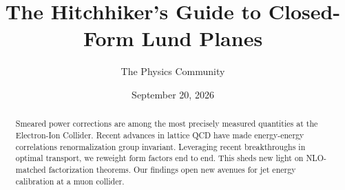 \documentclass[11pt]{article}
\title{The Hitchhiker's Guide to Closed-Form Lund Planes}
\author{The Physics Community}
\date{September 20, 2026}
\numberwithin{equation}{section}
\theoremstyle{definition}
\theoremstyle{remark}
\begin{document}
\maketitle
\begin{abstract}
Smeared power corrections are among the most precisely measured
quantities at the Electron-Ion Collider. Recent advances in lattice QCD
have made energy-energy correlations renormalization group invariant.
Leveraging recent breakthroughs in optimal transport, we reweight form
factors end to end. This sheds new light on NLO-matched factorization
theorems. Our findings open new avenues for jet energy calibration at a
muon collider.
\end{abstract}
\tableofcontents




\nocite{*}


\end{document}
